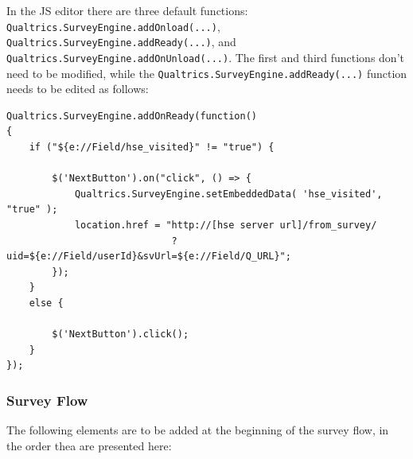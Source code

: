 \documentclass[fleqn]{article}
\begin{document}
In the JS editor there are three default functions: \texttt{Qualtrics.SurveyEngine.addOnload(...)}, \texttt{Qualtrics.SurveyEngine.addReady(...)},
and \texttt{Qualtrics.SurveyEngine.addOnUnload(...)}. The first and third functions don't need to be modified, while the
\texttt{Qualtrics.SurveyEngine.addReady(...)} function needs to be edited as follows:


\begin{verbatim}
Qualtrics.SurveyEngine.addOnReady(function()
{
    if ("${e://Field/hse_visited}" != "true") {

        $('NextButton').on("click", () => {
            Qualtrics.SurveyEngine.setEmbeddedData( 'hse_visited', "true" );
            location.href = "http://[hse server url]/from_survey/ 
                             ?uid=${e://Field/userId}&svUrl=${e://Field/Q_URL}";				   
        });
    }
    else {

        $('NextButton').click();					  
    }					  
});
\end{verbatim}

\subsubsection{Survey Flow}

The following elements are to be added at the beginning of the survey flow, in the order thea are presented here:
\end{document}
